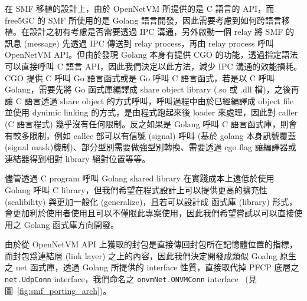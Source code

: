 在 SMF 移植的設計上，由於 OpenNetVM 所提供的是 C 語言的 API，而 free5GC 的 SMF 所使用的是 Golang 語言開發，因此需要考慮到如何跨語言移植。在設計之初有考慮是否需要透過 IPC 溝通，另外啟動一個 relay 將 SMF 的訊息 (message) 先透過 IPC 傳送到 relay process，再由 relay process 呼叫 OpenNetVM API。但由於發現 Golang 本身有提供 CGO 的功能，透過指定語法可以直接呼叫 C 語言 API，因此我們決定以此方法，減少 IPC 溝通的效能損耗。CGO 提供 C 呼叫 Go 語言函式或是 Go 呼叫 C 語言函式，若是以 C 呼叫 Golang，需要先將 Go 函式庫編譯成 share object library (.so 或 .dll 檔)，之後再讓 C 語言透過 share object 的方式呼叫，呼叫過程中由於已經編譯成 object file 並使用 dynimic linking 的方式，是由程式跑起來後 loader 來處理，因此對 caller (C 語言程式) 幾乎沒有任何限制。反之如果是 Golang 呼叫 C 語言函式庫，則會有較多限制，例如 callee 部可以有信號 (signal) 呼叫 (基於 golang 本身訊號覆蓋(signal mask)機制)、部分型別需要做強型別轉換、需要透過 cgo flag 讓編譯器或連結器得到相對 library 絕對位置等等。

儘管透過 C program 呼叫 Golang shared library 在實踐成本上遠低於使用 Golang 呼叫 C library，但我們希望在程式設計上可以提供更高的擴充性 (scalibility) 與更加一般化 (generalize)，且若可以設計成 函式庫 (library) 形式，會更加利於使用者使用且可以不僅限此專案使用，因此我們希望嘗試以可以直接使用之 Golang 函式庫方向開發。

由於從 OpenNetVM API 上獲取的封包是直接傳回封包所在記憶體位置的指標，而封包爲連結層 (link layer) 之上的內容，因此我們決定開發成類似 Goalng 原生之 net 函式庫，透過 Golang 所提供的 interface 性質，直接取代掉 PFCP 底層之 \lstinline[language=Go]{net.UdpConn} interface，我們命名之 \lstinline[language=Go]{onvmNet.ONVMConn} interface~\cite{github.onvmNet} (見圖~\ref{fig:smf_porting_arch})。

